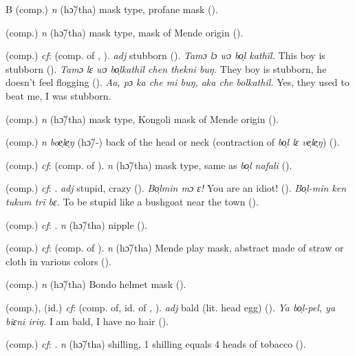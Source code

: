 \begin{letter}{B}
 (comp.) \textit{n} (hɔ̃/tha) mask type, profane mask (\citealt{Pichl1967}). 

 (comp.) \textit{n} (hɔ̃/tha) mask type, mask of Mende origin (\citealt{Pichl1967}).

 (comp.) \textit{cf}:  (comp. of , ). \textit{adj} stubborn (\citealt{Pichl1967}). \textit{Tamɔ lɔ wɔ bo̹l kathïl.} This boy is stubborn (\citealt{Pichl1967}). \textit{Tamɔ lɛ wɔ bo̹lkathïl chen thekni buŋ.} They boy is stubborn, he doesn't feel flogging (\citealt{Pichl1967}). \textit{Aa, pɔ ka che mi buŋ, aka che bolkathil.} Yes, they used to beat me, I was stubborn.

 (comp.) \textit{n} (hɔ̃/tha) mask type, Kongoli mask of Mende origin (\citealt{Pichl1967}).

 (comp.) \textit{n} \textit{boe̹le̹ŋ} (hɔ̃/-) back of the head or neck (contraction of \textit{bo̹l lɛ ve̹le̹ŋ}) (\citealt{Pichl1967}).

 (comp.) \textit{cf}:  (comp. of ). \textit{n} (hɔ̃/tha) mask type, same as \textit{bo̹l nafali} (\citealt{Pichl1967}).

 (comp.) \textit{cf}: . \textit{adj} stupid, crazy (\citealt{Pichl1967}). \textit{Bo̹lmin mɔ ɛ!} You are an idiot! (\citealt{Pichl1967}). \textit{Bo̹l-min ken tukum trï bɛ.} To be stupid like a bushgoat near the town (\citealt{Pichl1967}). 

 (comp.) \textit{cf}: . \textit{n} (hɔ̃/tha) nipple (\citealt{Pichl1967}). 

 (comp.) \textit{cf}:  (comp. of ). \textit{n} (hɔ̃/tha) Mende play mask, abstract made of straw or cloth in various colors (\citealt{Pichl1967}). 

 (comp.) \textit{n} (hɔ̃/tha) Bondo helmet mask (\citealt{Pichl1967}). 

 (comp.), (id.) \textit{cf}:  (comp. of, id. of , ). \textit{adj} bald (lit. head egg) (\citealt{Pichl1967}). \textit{Ya bo̹l-pel, ya biɛni iriŋ.} I am bald, I have no hair (\citealt{Pichl1967}). 

 (comp.) \textit{cf}: . \textit{n} (hɔ̃/tha) shilling, 1 shilling equals 4 heads of tobacco (\citealt{Pichl1967}). 


\end{letter}
